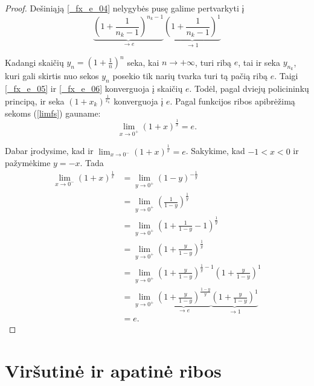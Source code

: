 \begin{exmp}
\begin{proof}
    Dešiniąją \ref{_fx_e_04} nelygybės pusę galime pertvarkyti į
    \begin{equation}
      \underbrace{\left( 1 + \frac{1}{n_{k}-1} \right)^{n_{k}-1}}_{\to e}
      \underbrace{\left( 1 + \frac{1}{n_{k}-1} \right)^{1}}_{\to 1}
      \label{_fx_e_06}
    \end{equation}

    Kadangi skaičių $y_{n} = (1 + \frac{1}{n})^n$ seka, kai 
    $n \to +\infty$, turi ribą $e$, tai ir seka $y_{n_{k}}$, kuri
    gali skirtis nuo sekos $y_{n}$ posekio tik narių tvarka turi 
    tą pačią ribą $e$. Taigi \ref{_fx_e_05} ir \ref{_fx_e_06} 
    konverguoja į skaičių $e$. Todėl, pagal dviejų policininkų
    principą, ir seka $(1 + x_{k})^{\frac{1}{x_{k}}}$ konverguoja į
    $e$. Pagal funkcijos ribos apibrėžimą sekoms (\ref{limfs})
    gauname:
    \begin{equation}
      \lim _{x \to 0^{+}} (1 + x)^{\frac{1}{x}} = e.
      \label{_fx_e_07}
    \end{equation}

    Dabar įrodysime, kad ir 
    $\lim _{x \to 0^{-}} (1 + x)^{\frac{1}{x}} = e$. Sakykime, kad
    $-1 < x < 0$ ir pažymėkime $y = -x$. Tada
    \begin{align*}
      \lim _{x \to 0^{-}} (1 + x)^{\frac{1}{x}} 
      &= \lim _{y \to 0^{+}} (1 - y)^{-\frac{1}{y}} \\
      &= \lim _{y \to 0^{+}} 
        \left( \frac{1}{1 - y} \right)^{\frac{1}{y}} \\
      &= \lim _{y \to 0^{+}} 
        \left( 1 + \frac{1}{1 - y} - 1 \right)^{\frac{1}{y}} \\
      &= \lim _{y \to 0^{+}} 
        \left( 1 + \frac{y}{1 - y} \right)^{\frac{1}{y}} \\
      &= \lim _{y \to 0^{+}} 
        \left( 1 + \frac{y}{1 - y} \right)^{\frac{1}{y} - 1}
        \left( 1 + \frac{y}{1 - y} \right)^{1} \\
      &= \lim _{y \to 0^{+}} 
        \underbrace{
          \left( 1 + \frac{y}{1 - y} \right)^{\frac{1 - y}{y}}}_{\to e}
        \underbrace{
          \left( 1 + \frac{y}{1 - y} \right)^{1}}_{\to 1} \\
      &= e.
    \end{align*}

  \end{proof}
\end{exmp}

\section{Viršutinė ir apatinė ribos}


